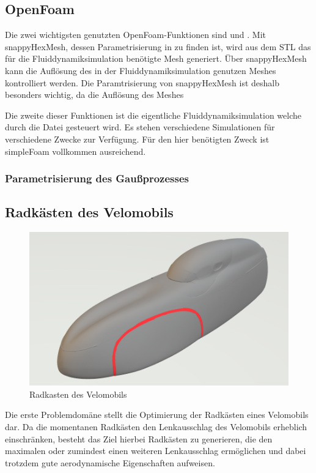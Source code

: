 \subsection{OpenFoam}
Die zwei wichtigsten genutzten OpenFoam-Funktionen sind  und .
Mit snappyHexMesh, dessen Parametrisierung in  zu finden ist, wird aus dem STL das für die Fluiddynamiksimulation benötigte Mesh generiert. Über snappyHexMesh kann die Auflösung des in der Fluiddynamiksimulation genutzen Meshes kontrolliert werden.
Die Paramtrisierung von snappyHexMesh ist deshalb besonders wichtig, da die Auflösung des Meshes


Die zweite dieser Funktionen ist die eigentliche Fluiddynamiksimulation welche durch die Datei  gesteuert wird. 
Es stehen verschiedene Simulationen für verschiedene Zwecke zur Verfügung.
Für den hier benötigten Zweck ist simpleFoam vollkommen ausreichend.

\subsubsection{Parametrisierung des Gaußprozesses}


\subsection{Radkästen des Velomobils}

\begin{figure}[h]
	\centering
	\includegraphics[width=.8\linewidth]{bilder/velo_wheelcase}
	\caption{Radkasten des Velomobils}
	\label{fig:wheelcase}
\end{figure}

Die erste Problemdomäne stellt die Optimierung der Radkästen eines Velomobils dar.
Da die momentanen Radkästen den Lenkausschlag des Velomobils erheblich einschränken, besteht das Ziel hierbei Radkästen zu generieren, die den maximalen oder zumindest einen weiteren Lenkausschlag ermöglichen und dabei trotzdem gute aerodynamische Eigenschaften aufweisen.

